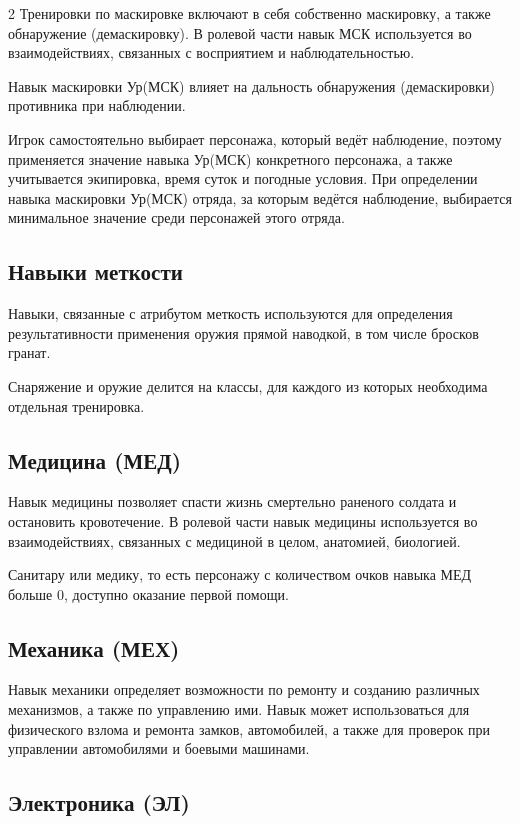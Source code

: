 \documentclass{article}
\begin{document}
\begin{multicols}{2}
Тренировки по маскировке включают в себя собственно маскировку, а также
обнаружение (демаскировку).
В ролевой части навык МСК используется во
взаимодействиях, связанных с восприятием и наблюдательностью.

Навык маскировки Ур(МСК) влияет на дальность обнаружения (демаскировки)
противника при наблюдении.

Игрок самостоятельно выбирает персонажа, который ведёт наблюдение,
поэтому применяется значение навыка Ур(МСК) конкретного персонажа, а
также учитывается экипировка, время суток и погодные условия. При
определении навыка маскировки Ур(МСК) отряда, за которым ведётся
наблюдение, выбирается минимальное значение среди персонажей этого
отряда.

\subsection{Навыки меткости}\label{weapon-skills}

Навыки, связанные с атрибутом меткость используются для определения
результативности применения оружия прямой наводкой, в том числе бросков
гранат.

Снаряжение и оружие делится на классы, для каждого из которых необходима
отдельная тренировка.

\subsection{Медицина (МЕД)}\label{medicine}

Навык медицины позволяет спасти жизнь смертельно раненого солдата и
остановить кровотечение. В ролевой части навык медицины используется во
взаимодействиях, связанных с медициной в целом, анатомией, биологией.

Санитару или медику, то есть персонажу с количеством очков навыка МЕД
больше 0, доступно оказание первой
помощи.

\subsection{Механика (МЕХ)}\label{mechanics}

Навык механики определяет возможности по ремонту и созданию различных
механизмов, а также по управлению ими. Навык может использоваться для
физического взлома и ремонта замков, автомобилей, а также для проверок
при управлении автомобилями и боевыми машинами.

\subsection{Электроника (ЭЛ)}\label{electronics}


\end{multicols}
\end{document}
